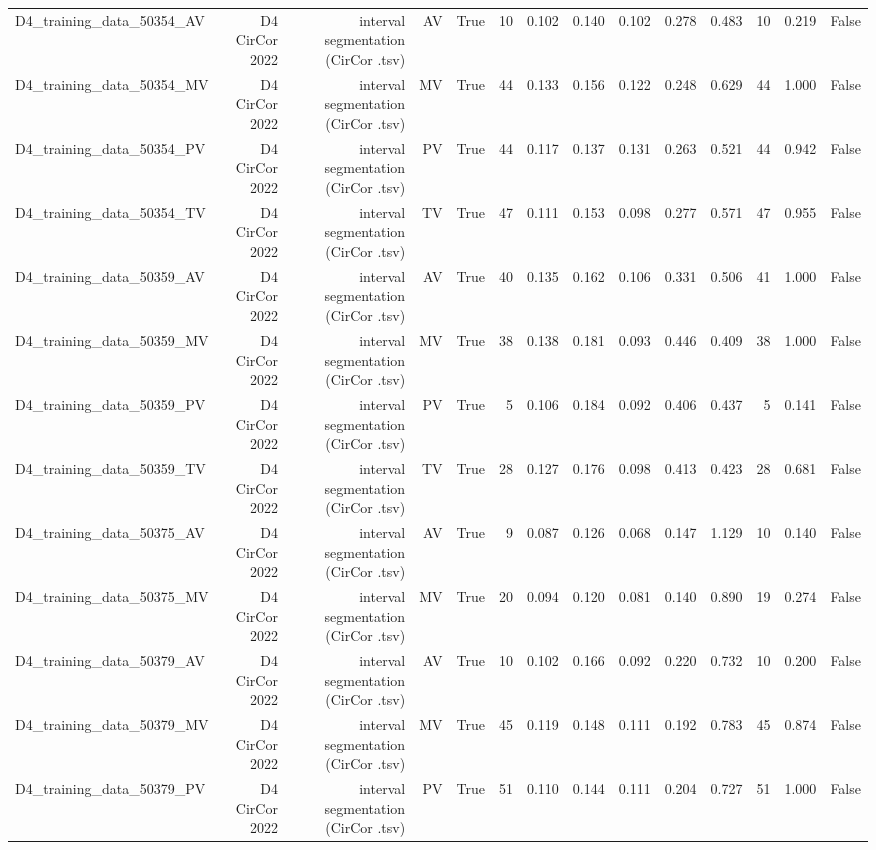 \begin{table}[htbp]
\begin{tabular}{lrrrrrrrrrrrrr}
    D4\_training\_data\_50354\_AV & D4 CirCor 2022 & interval segmentation (CirCor .tsv) & AV & True & 10 & 0.102 & 0.140 & 0.102 & 0.278 & 0.483 & 10 & 0.219 & False \\
    D4\_training\_data\_50354\_MV & D4 CirCor 2022 & interval segmentation (CirCor .tsv) & MV & True & 44 & 0.133 & 0.156 & 0.122 & 0.248 & 0.629 & 44 & 1.000 & False \\
    D4\_training\_data\_50354\_PV & D4 CirCor 2022 & interval segmentation (CirCor .tsv) & PV & True & 44 & 0.117 & 0.137 & 0.131 & 0.263 & 0.521 & 44 & 0.942 & False \\
    D4\_training\_data\_50354\_TV & D4 CirCor 2022 & interval segmentation (CirCor .tsv) & TV & True & 47 & 0.111 & 0.153 & 0.098 & 0.277 & 0.571 & 47 & 0.955 & False \\
    D4\_training\_data\_50359\_AV & D4 CirCor 2022 & interval segmentation (CirCor .tsv) & AV & True & 40 & 0.135 & 0.162 & 0.106 & 0.331 & 0.506 & 41 & 1.000 & False \\
    D4\_training\_data\_50359\_MV & D4 CirCor 2022 & interval segmentation (CirCor .tsv) & MV & True & 38 & 0.138 & 0.181 & 0.093 & 0.446 & 0.409 & 38 & 1.000 & False \\
    D4\_training\_data\_50359\_PV & D4 CirCor 2022 & interval segmentation (CirCor .tsv) & PV & True & 5 & 0.106 & 0.184 & 0.092 & 0.406 & 0.437 & 5 & 0.141 & False \\
    D4\_training\_data\_50359\_TV & D4 CirCor 2022 & interval segmentation (CirCor .tsv) & TV & True & 28 & 0.127 & 0.176 & 0.098 & 0.413 & 0.423 & 28 & 0.681 & False \\
    D4\_training\_data\_50375\_AV & D4 CirCor 2022 & interval segmentation (CirCor .tsv) & AV & True & 9 & 0.087 & 0.126 & 0.068 & 0.147 & 1.129 & 10 & 0.140 & False \\
    D4\_training\_data\_50375\_MV & D4 CirCor 2022 & interval segmentation (CirCor .tsv) & MV & True & 20 & 0.094 & 0.120 & 0.081 & 0.140 & 0.890 & 19 & 0.274 & False \\
    D4\_training\_data\_50379\_AV & D4 CirCor 2022 & interval segmentation (CirCor .tsv) & AV & True & 10 & 0.102 & 0.166 & 0.092 & 0.220 & 0.732 & 10 & 0.200 & False \\
    D4\_training\_data\_50379\_MV & D4 CirCor 2022 & interval segmentation (CirCor .tsv) & MV & True & 45 & 0.119 & 0.148 & 0.111 & 0.192 & 0.783 & 45 & 0.874 & False \\
    D4\_training\_data\_50379\_PV & D4 CirCor 2022 & interval segmentation (CirCor .tsv) & PV & True & 51 & 0.110 & 0.144 & 0.111 & 0.204 & 0.727 & 51 & 1.000 & False \\

\end{tabular}
\end{table}
